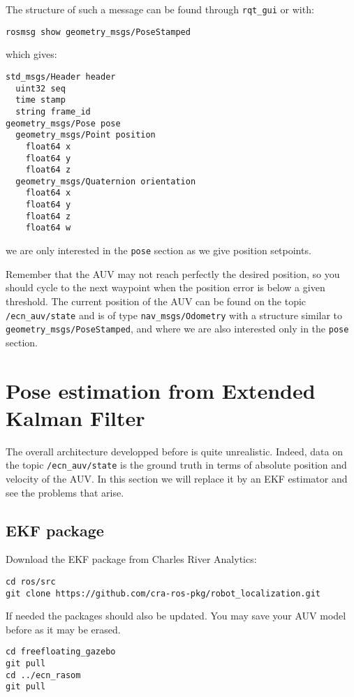 \documentclass{ecnreport}
\begin{document}
The structure of such a message can be found through \texttt{rqt\_gui} or with:
\begin{center}
\begin{lstlisting}
rosmsg show geometry_msgs/PoseStamped
\end{lstlisting}
\end{center}
which gives:
\begin{center}
\begin{lstlisting}
std_msgs/Header header
  uint32 seq
  time stamp
  string frame_id
geometry_msgs/Pose pose
  geometry_msgs/Point position
    float64 x
    float64 y
    float64 z
  geometry_msgs/Quaternion orientation
    float64 x
    float64 y
    float64 z
    float64 w

\end{lstlisting}
\end{center}we are only interested in the \texttt{pose} section as we give position setpoints.

Remember that the AUV may not reach perfectly the desired position, so you should cycle to the next waypoint when the position error is below a given threshold.
The current position of the AUV can be found on the topic \texttt{/ecn\_auv/state} and is of type \texttt{nav\_msgs/Odometry} with a structure similar to \texttt{geometry\_msgs/PoseStamped}, and where we are also interested only
in the \texttt{pose} section.

\newpage

\section{Pose estimation from Extended Kalman Filter}

The overall architecture developped before is quite unrealistic. Indeed, data on the topic \texttt{/ecn\_auv/state} is the ground truth in terms of absolute position and velocity of the AUV.
In this section we will replace it by an EKF estimator and see the problems that arise.

\subsection{EKF package}

Download the EKF package from Charles River Analytics:

\begin{center}
\begin{lstlisting}
cd ros/src
git clone https://github.com/cra-ros-pkg/robot_localization.git
\end{lstlisting}
\end{center}

If needed the packages should also be updated. You may save your AUV model before as it may be erased.

\begin{center}
\begin{lstlisting}
cd freefloating_gazebo
git pull
cd ../ecn_rasom
git pull
\end{lstlisting}
\end{center}
\end{document}
